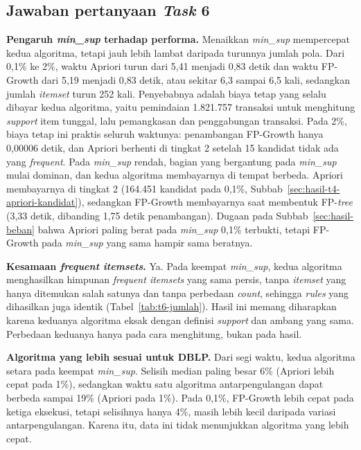 \subsection{Jawaban pertanyaan \textit{Task} 6}
\label{sec:jawab-t6}
\textbf{Pengaruh \textit{min\_sup} terhadap performa.} Menaikkan \textit{min\_sup} mempercepat kedua algoritma, tetapi jauh lebih lambat daripada turunnya jumlah pola. Dari 0,1\% ke 2\%, waktu Apriori turun dari 5,41 menjadi 0,83 detik dan waktu FP-Growth dari 5,19 menjadi 0,83 detik, atau sekitar 6,3 sampai 6,5 kali, sedangkan jumlah \textit{itemset} turun 252 kali. Penyebabnya adalah biaya tetap yang selalu dibayar kedua algoritma, yaitu pemindaian 1.821.757 transaksi untuk menghitung \textit{support} item tunggal, lalu pemangkasan dan penggabungan transaksi. Pada 2\%, biaya tetap ini praktis seluruh waktunya: penambangan FP-Growth hanya 0,00006 detik, dan Apriori berhenti di tingkat 2 setelah 15 kandidat tidak ada yang \textit{frequent}. Pada \textit{min\_sup} rendah, bagian yang bergantung pada \textit{min\_sup} mulai dominan, dan kedua algoritma membayarnya di tempat berbeda. Apriori membayarnya di tingkat 2 (164.451 kandidat pada 0,1\%, Subbab~\ref{sec:hasil-t4-apriori-kandidat}), sedangkan FP-Growth membayarnya saat membentuk FP-\textit{tree} (3,33 detik, dibanding 1,75 detik penambangan). Dugaan pada Subbab~\ref{sec:hasil-beban} bahwa Apriori paling berat pada \textit{min\_sup} 0,1\% terbukti, tetapi FP-Growth pada \textit{min\_sup} yang sama hampir sama beratnya.

\textbf{Kesamaan \textit{frequent itemsets}.} Ya. Pada keempat \textit{min\_sup}, kedua algoritma menghasilkan himpunan \textit{frequent itemsets} yang sama persis, tanpa \textit{itemset} yang hanya ditemukan salah satunya dan tanpa perbedaan \textit{count}, sehingga \textit{rules} yang dihasilkan juga identik (Tabel~\ref{tab:t6-jumlah}). Hasil ini memang diharapkan karena keduanya algoritma eksak dengan definisi \textit{support} dan ambang yang sama. Perbedaan keduanya hanya pada cara menghitung, bukan pada hasil.

\textbf{Algoritma yang lebih sesuai untuk DBLP.} Dari segi waktu, kedua algoritma setara pada keempat \textit{min\_sup}. Selisih median paling besar 6\% (Apriori lebih cepat pada 1\%), sedangkan waktu satu algoritma antarpengulangan dapat berbeda sampai 19\% (Apriori pada 1\%). Pada 0,1\%, FP-Growth lebih cepat pada ketiga eksekusi, tetapi selisihnya hanya 4\%, masih lebih kecil daripada variasi antarpengulangan. Karena itu, data ini tidak menunjukkan algoritma yang lebih cepat.

